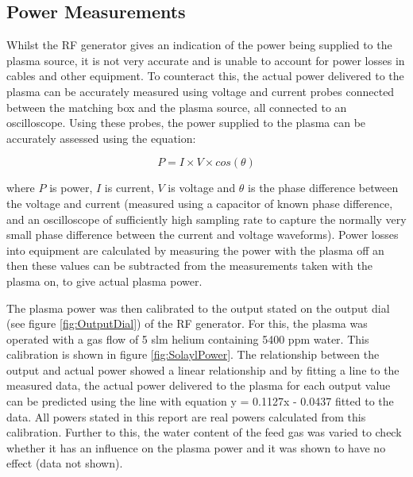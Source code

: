 \documentclass[11pt, oneside]{article}   	%
\begin{document}
\subsection{Power Measurements}

Whilst the RF generator gives an indication of the power being supplied to the plasma source, it is not very accurate and is unable to account for power losses in cables and other equipment.
To counteract this, the actual power delivered to the plasma can be accurately measured using voltage and current probes connected between the matching box and the plasma source, all connected to an oscilloscope. 
Using these probes, the power supplied to the plasma can be accurately assessed using the equation:

\begin{equation}
P = I \times V \times cos(\theta)
\end{equation}

where $P$ is power, $I$ is current, $V$ is voltage and $\theta$ is the phase difference between the voltage and current (measured using a capacitor of known phase difference, and an oscilloscope of sufficiently high sampling rate to capture the normally very small phase difference between the current and voltage waveforms).
Power losses into equipment are calculated by measuring the power with the plasma off an then these values can be subtracted from the measurements taken with the plasma on, to give actual plasma power.





The plasma power was then calibrated to the output stated on the output dial (see figure \ref{fig:OutputDial}) of the RF generator. 
For this, the plasma was operated with a gas flow of 5 slm helium containing 5400 ppm water.
This calibration is shown in figure \ref{fig:SolaylPower}.
The relationship between the output and actual power showed a linear relationship and by fitting a line to the measured data, the actual power delivered to the plasma for each output value can be predicted using the line with equation y = 0.1127x - 0.0437 fitted to the data.
All powers stated in this report are real powers calculated from this calibration.
Further to this, the water content of the feed gas was varied to check whether it has an influence on the plasma power and it was shown to have no effect (data not shown).
\end{document}
